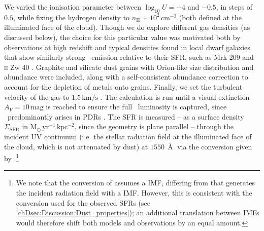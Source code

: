 We varied the ionisation parameter between $\log_{10} U = -4$ and $-0.5$, in steps of $0.5$, while fixing the hydrogen density to $n_\text{H} \sim 10^2 \, \mathrm{cm^{-3}}$ (both defined at the illuminated face of the cloud). Though we do explore different gas densities (as discussed below), the choice for this particular value was motivated both by observations at high redshift \citep[e.g.][]{2016ApJ...816...23S} and typical densities found in local dwarf galaxies that show similarly strong \OIIILam\ emission relative to their SFR, such as Mrk 209 \citep{1997ApJS..108....1I} and \textsc{\lowercase{II}} Zw 40 \citep{2000ApJ...531..776G}. Graphite and silicate dust grains with Orion-like size distribution and abundance were included, along with a self-consistent abundance correction to account for the depletion of metals onto grains. Finally, we set the turbulent velocity of the gas to $1.5 \, \mathrm{km/s}$ \citep{2019A&A...626A..23C}. The calculation is run until a visual extinction $A_V = 10 \, \mathrm{mag}$ is reached to ensure the full \CIILam\ luminosity is captured, since \CII\ predominantly arises in PDRs \citep[e.g.][]{2005AAS...207.8117A}. The SFR is measured -- as a surface density $\Sigma_\text{SFR}$ in $\mathrm{M_\odot \, yr^{-1} \, kpc^{-2}}$, since the geometry is plane parallel -- through the incident UV continuum (i.e. the stellar radiation field at the illuminated face of the cloud, which is not attenuated by dust) at $1550 \, \Angstrom$ via the conversion given by \citet{2012ARA&A..50..531K}.\footnote{We note that the conversion of \citet{2012ARA&A..50..531K} assumes a \citet{2003ApJ...598.1076K} IMF, differing from  that generates the incident radiation field with a \citeauthor{1955ApJ...121..161S} IMF. However, this is consistent with the conversion used for the observed SFRs (see \cref{chDsec:Discussion:Dust_properties}); an additional translation between IMFs would therefore shift both models and observations by an equal amount.}

